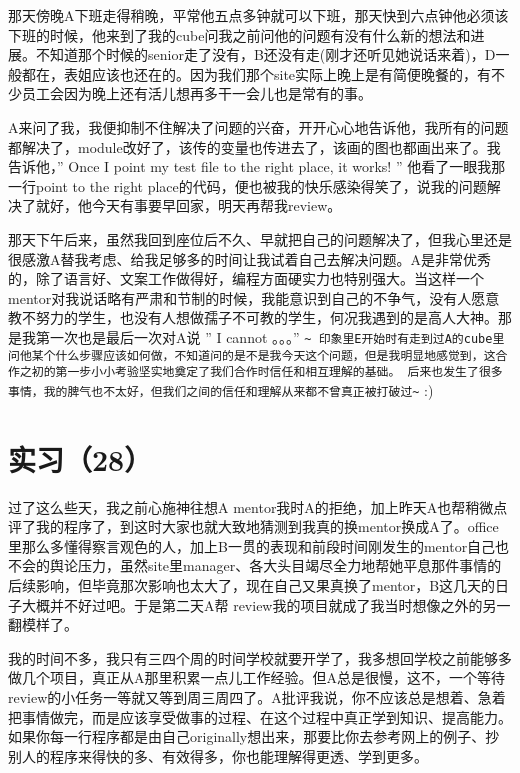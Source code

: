 \documentclass[12pt]{book}
\begin{document}
那天傍晚A下班走得稍晚，平常他五点多钟就可以下班，那天快到六点钟他必须该下班的时候，他来到了我的cube问我之前问他的问题有没有什么新的想法和进展。不知道那个时候的senior走了没有，B还没有走(刚才还听见她说话来着)，D一般都在，表姐应该也还在的。因为我们那个site实际上晚上是有简便晚餐的，有不少员工会因为晚上还有活儿想再多干一会儿也是常有的事。

A来问了我，我便抑制不住解决了问题的兴奋，开开心心地告诉他，我所有的问题都解决了，module改好了，该传的变量也传进去了，该画的图也都画出来了。我告诉他，” Once I point my test file to the right place, it works!  ” 他看了一眼我那一行point to the right place的代码，便也被我的快乐感染得笑了，说我的问题解决了就好，他今天有事要早回家，明天再帮我review。

那天下午后来，虽然我回到座位后不久、早就把自己的问题解决了，但我心里还是很感激A替我考虑、给我足够多的时间让我试着自己去解决问题。A是非常优秀的，除了语言好、文案工作做得好，编程方面硬实力也特别强大。当这样一个mentor对我说话略有严肃和节制的时候，我能意识到自己的不争气，没有人愿意教不努力的学生，也没有人想做孺子不可教的学生，何况我遇到的是高人大神。那是我第一次也是最后一次对A说 ” I cannot 。。。” \verb,~ 印象里E开始时有走到过A的cube里问他某个什么步骤应该如何做，不知道问的是不是我今天这个问题，但是我明显地感觉到，这合作之初的第一步小小考验坚实地奠定了我们合作时信任和相互理解的基础。 后来也发生了很多事情，我的脾气也不太好，但我们之间的信任和理解从来都不曾真正被打破过~, :)

\section{实习（28）}
\label{sec-5-31}

过了这么些天，我之前心施神往想A mentor我时A的拒绝，加上昨天A也帮稍微点评了我的程序了，到这时大家也就大致地猜测到我真的换mentor换成A了。office里那么多懂得察言观色的人，加上B一贯的表现和前段时间刚发生的mentor自己也不会的舆论压力，虽然site里manager、各大头目竭尽全力地帮她平息那件事情的后续影响，但毕竟那次影响也太大了，现在自己又果真换了mentor，B这几天的日子大概并不好过吧。于是第二天A帮 review我的项目就成了我当时想像之外的另一翻模样了。

我的时间不多，我只有三四个周的时间学校就要开学了，我多想回学校之前能够多做几个项目，真正从A那里积累一点儿工作经验。但A总是很慢，这不，一个等待review的小任务一等就又等到周三周四了。A批评我说，你不应该总是想着、急着把事情做完，而是应该享受做事的过程、在这个过程中真正学到知识、提高能力。如果你每一行程序都是由自己originally想出来，那要比你去参考网上的例子、抄别人的程序来得快的多、有效得多，你也能理解得更透、学到更多。
\end{document}
